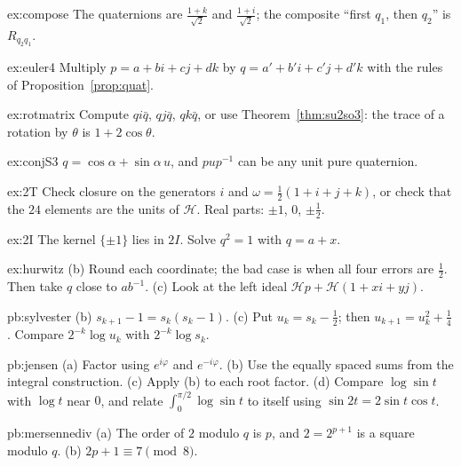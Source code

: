 \begin{hint}{ex:compose}
The quaternions are $\frac{1+k}{\sqrt2}$ and $\frac{1+i}{\sqrt2}$; the composite ``first $q_1$, then $q_2$'' is $R_{q_2q_1}$.
\end{hint}
\begin{hint}{ex:euler4}
Multiply $p=a+bi+cj+dk$ by $q=a'+b'i+c'j+d'k$ with the rules of Proposition~\ref{prop:quat}.
\end{hint}
\begin{hint}{ex:rotmatrix}
Compute $qi\bar q$, $qj\bar q$, $qk\bar q$, or use Theorem~\ref{thm:su2so3}: the trace of a rotation by $\theta$ is $1+2\cos\theta$.
\end{hint}
\begin{hint}{ex:conjS3}
$q=\cos\alpha+\sin\alpha\,u$, and $pup^{-1}$ can be any unit pure quaternion.
\end{hint}
\begin{hint}{ex:2T}
Check closure on the generators $i$ and $\omega=\frac12(1+i+j+k)$, or check that the $24$ elements are the units of $\mathcal H$. Real parts: $\pm1$, $0$, $\pm\frac12$.
\end{hint}
\begin{hint}{ex:2I}
The kernel $\{\pm1\}$ lies in $2I$. Solve $q^2=1$ with $q=a+x$.
\end{hint}
\begin{hint}{ex:hurwitz}
(b) Round each coordinate; the bad case is when all four errors are $\frac12$. Then take $q$ close to $ab^{-1}$. (c) Look at the left ideal $\mathcal Hp+\mathcal H(1+xi+yj)$.
\end{hint}

\begin{hint}{pb:sylvester}
(b) $s_{k+1}-1=s_k(s_k-1)$. (c) Put $u_k=s_k-\frac12$; then $u_{k+1}=u_k^2+\frac14$. Compare $2^{-k}\log u_k$ with $2^{-k}\log s_k$.
\end{hint}

\begin{hint}{pb:jensen}
(a) Factor using $e^{i\varphi}$ and $e^{-i\varphi}$. (b) Use the equally spaced sums from the integral construction. (c) Apply (b) to each root factor. (d) Compare $\log\sin t$ with $\log t$ near $0$, and relate $\int_0^{\pi/2}\log\sin t$ to itself using $\sin2t=2\sin t\cos t$.
\end{hint}

\begin{hint}{pb:mersennediv}
(a) The order of $2$ modulo $q$ is $p$, and $2=2^{p+1}$ is a square modulo $q$. (b) $2p+1\equiv7\pmod8$.
\end{hint}

